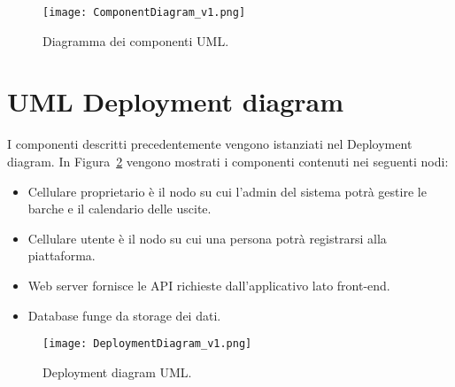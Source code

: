 \begin{figure}[h]
    \centering
    \texttt{[image: ComponentDiagram\_v1.png]}
    \caption{Diagramma dei componenti UML.}\label{fig:componentDiagram}
\end{figure}

\section{UML Deployment diagram}
I componenti descritti precedentemente vengono istanziati nel Deployment diagram. In Figura~\ref{fig:deploymentDiagram} vengono mostrati i componenti contenuti nei seguenti nodi:

\begin{itemize}
    \item Cellulare proprietario è il nodo su cui l'admin del sistema potrà gestire le barche e il calendario delle uscite.
    \item Cellulare utente è il nodo su cui una persona potrà registrarsi alla piattaforma.
    \item Web server fornisce le API richieste dall'applicativo lato front-end.
    \item Database funge da storage dei dati.
\end{itemize}

\begin{figure}[h]
    \centering
    \texttt{[image: DeploymentDiagram\_v1.png]}
    \caption{Deployment diagram UML.}\label{fig:deploymentDiagram}
\end{figure}